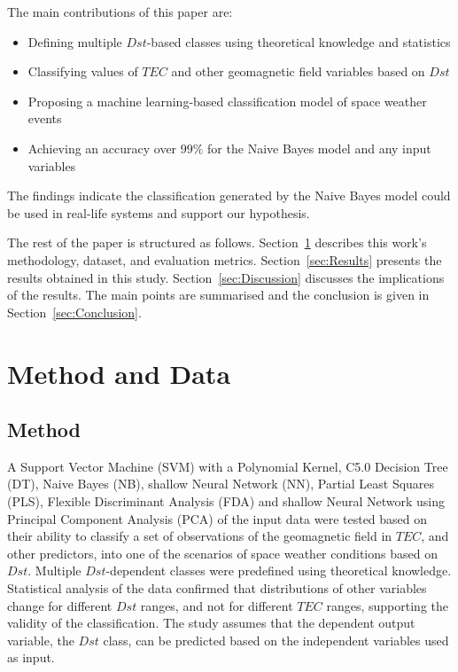 \documentclass[sn-mathphys-num]{sn-jnl}%
\begin{document}
The main contributions of this paper are:

\begin{itemize}
    \item Defining multiple $Dst$-based classes using theoretical knowledge and statistics
    \item Classifying values of $TEC$ and other geomagnetic field variables based on $Dst$
    \item Proposing a machine learning-based classification model of space weather events
    \item Achieving an accuracy over $99\%$ for the Naive Bayes model and any input variables
\end{itemize}

The findings indicate the classification generated by the Naive Bayes model could be used in real-life systems and support our hypothesis.

The rest of the paper is structured as follows. Section~\ref{sec:Dataset} describes this work's methodology, dataset, and evaluation metrics. Section~\ref{sec:Results} presents the results obtained in this study. Section~\ref{sec:Discussion} discusses the implications of the results. The main points are summarised and the conclusion is given in Section~\ref{sec:Conclusion}.

\section{Method and Data}
\label{sec:Dataset}

\subsection{Method}

A Support Vector Machine (SVM) with a Polynomial Kernel, C5.0 Decision Tree (DT), Naive Bayes (NB), shallow Neural Network (NN), Partial Least Squares (PLS), Flexible Discriminant Analysis (FDA) and shallow Neural Network using Principal Component Analysis (PCA) of the input data were tested based on their ability to classify a set of observations of the geomagnetic field in $TEC$, and other predictors, into one of the scenarios of space weather conditions based on $Dst$. Multiple $Dst$-dependent classes were predefined using theoretical knowledge. Statistical analysis of the data confirmed that distributions of other variables change for different $Dst$ ranges, and not for different $TEC$ ranges, supporting the validity of the classification. The study assumes that the dependent output variable, the $Dst$ class, can be predicted based on the independent variables used as input.
\end{document}
